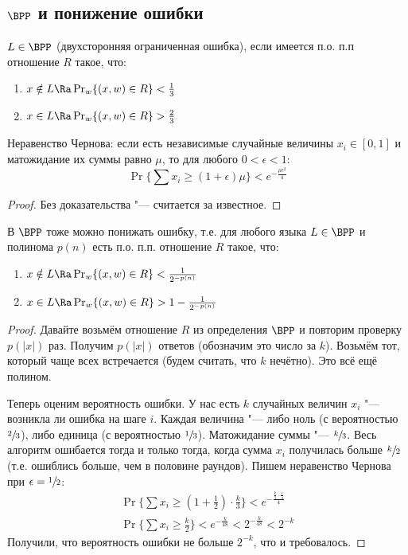 \subsection[BPP и понижение ошибки]{$\BPP$ и понижение ошибки}
	\begin{Def}
		$L \in \BPP$ (двухсторонняя ограниченная ошибка), если имеется п.о. п.п отношение $R$ такое, что:
		\begin{enumerate}
			\item $x \notin L \Ra \Pr_w \{ (x, w) \in R \} < \frac 13$
			\item $x \in L \Ra \Pr_w \{ (x, w) \in R \} > \frac 23$
		\end{enumerate}
	\end{Def}
	\begin{assertion}
		Неравенство Чернова: если есть независимые случайные величины $x_i \in [0, 1]$ и матожидание их суммы равно $\mu$, то для любого $0<\epsilon<1$:
		\[
			\Pr\{ \sum x_i \ge (1+\epsilon)\mu \} < e^{-\frac{\mu \epsilon^2}{4}}
		\]
	\end{assertion}
	\begin{proof}
		Без доказательства "--- считается за известное.
	\end{proof}
	\begin{theorem}
		В $\BPP$ тоже можно понижать ошибку, т.е. для любого языка $L \in \BPP$ и полинома $p(n)$ есть п.о. п.п. отношение $R$ такое, что:
		\begin{enumerate}
			\item $x \notin L \Ra \Pr_w \{ (x, w) \in R \} < \frac 1{2^{-p(n)}}$
			\item $x \in L \Ra \Pr_w \{ (x, w) \in R \} > 1 - \frac 1{2^{-p(n)}}$
		\end{enumerate}
	\end{theorem}
	\begin{proof}
		Давайте возьмём отношение $R$ из определения $\BPP$ и повторим проверку $p(|x|)$ раз.
		Получим $p(|x|)$ ответов (обозначим это число за $k$).
		Возьмём тот, который чаще всех встречается (будем считать, что $k$ нечётно).
        Это всё ещё полином.

		Теперь оценим вероятность ошибки.
		У нас есть $k$ случайных величин $x_i$ "--- возникла ли ошибка на шаге $i$.
		Каждая величина "--- либо ноль (с вероятностью $\sfrac 23$), либо единица (с вероятностью $\sfrac 13$).
		Матожидание суммы "--- $\sfrac{k}{3}$.
		Весь алгоритм ошибается тогда и только тогда, когда сумма $x_i$ получилась больше $\sfrac{k}{2}$ (т.е. ошиблись больше, чем в половине раундов).
		Пишем неравенство Чернова при $\epsilon=\sfrac12$:
		\begin{gather*}
			\Pr\{ \sum x_i \ge \left(1+ \frac 12\right)\cdot \frac k3 \} < e^{-\frac{\frac{k}{3}\cdot\frac{1}{4}}{4}} \\
			\Pr\{ \sum x_i \ge \frac k2 \} < e^{-\frac{k}{48}} < 2^{-\frac{k}{48}} < 2^{-k}
		\end{gather*}
		Получили, что вероятность ошибки не больше $2^{-k}$, что и требовалось.
	\end{proof}
